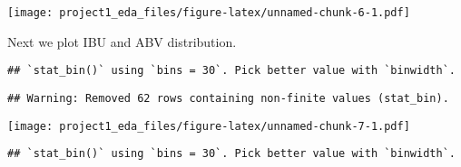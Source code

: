 \documentclass[]{article}
\newenvironment{Shaded}{\begin{snugshade}}{\end{snugshade}}
\newcommand{\CommentTok}[1]{\textcolor[rgb]{0.56,0.35,0.01}{\textit{#1}}}
\newcommand{\DataTypeTok}[1]{\textcolor[rgb]{0.13,0.29,0.53}{#1}}
\newcommand{\KeywordTok}[1]{\textcolor[rgb]{0.13,0.29,0.53}{\textbf{#1}}}
\newcommand{\NormalTok}[1]{#1}
\newcommand{\OperatorTok}[1]{\textcolor[rgb]{0.81,0.36,0.00}{\textbf{#1}}}
\newcommand{\StringTok}[1]{\textcolor[rgb]{0.31,0.60,0.02}{#1}}
\begin{document}
\texttt{[image: project1\_eda\_files/figure-latex/unnamed-chunk-6-1.pdf]}

Next we plot IBU and ABV distribution.

\begin{Shaded}
\end{Shaded}

\begin{verbatim}
## `stat_bin()` using `bins = 30`. Pick better value with `binwidth`.
\end{verbatim}

\begin{verbatim}
## Warning: Removed 62 rows containing non-finite values (stat_bin).
\end{verbatim}

\texttt{[image: project1\_eda\_files/figure-latex/unnamed-chunk-7-1.pdf]}

\begin{Shaded}
\end{Shaded}

\begin{verbatim}
## `stat_bin()` using `bins = 30`. Pick better value with `binwidth`.
\end{verbatim}
\end{document}
